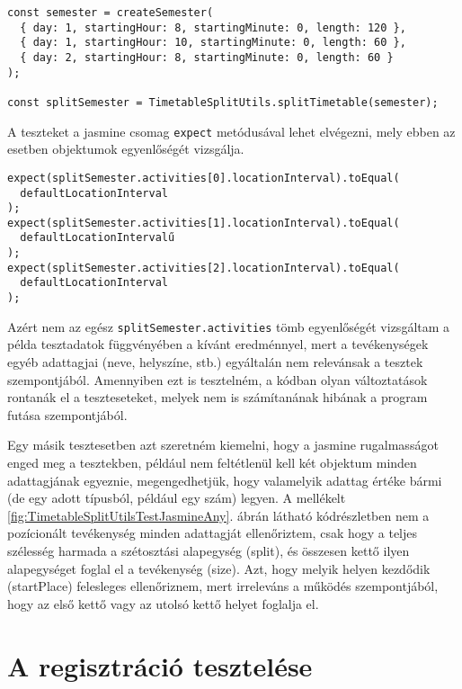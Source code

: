 \documentclass[a4paper,12pt]{report}
\begin{document}
\pagebreak
\begin{samepage}
    \begin{verbatim}
const semester = createSemester(
  { day: 1, startingHour: 8, startingMinute: 0, length: 120 },
  { day: 1, startingHour: 10, startingMinute: 0, length: 60 },
  { day: 2, startingHour: 8, startingMinute: 0, length: 60 }
);

const splitSemester = TimetableSplitUtils.splitTimetable(semester);
    \end{verbatim}
\end{samepage}

A teszteket a jasmine csomag \verb|expect| metódusával lehet elvégezni, mely ebben az esetben objektumok egyenlőségét vizsgálja.

\begin{samepage}
    \begin{verbatim}
expect(splitSemester.activities[0].locationInterval).toEqual(
  defaultLocationInterval
);
expect(splitSemester.activities[1].locationInterval).toEqual(
  defaultLocationIntervalű
);
expect(splitSemester.activities[2].locationInterval).toEqual(
  defaultLocationInterval
);
    \end{verbatim}
\end{samepage}

Azért nem az egész \verb|splitSemester.activities| tömb egyenlőségét vizsgáltam a példa tesztadatok függvényében a kívánt eredménnyel, mert a tevékenységek egyéb adattagjai (neve, helyszíne, stb.) egyáltalán nem relevánsak a tesztek szempontjából. Amennyiben ezt is tesztelném, a kódban olyan változtatások rontanák el a teszteseteket, melyek nem is számítanának hibának a program futása szempontjából.

Egy másik tesztesetben azt szeretném kiemelni, hogy a jasmine rugalmasságot enged meg a tesztekben, például nem feltétlenül kell két objektum minden adattagjának egyeznie, megengedhetjük, hogy valamelyik adattag értéke bármi (de egy adott típusból, például egy szám) legyen. A mellékelt \ref{fig:TimetableSplitUtilsTestJasmineAny}. ábrán látható kódrészletben nem a pozícionált tevékenység minden adattagját ellenőriztem, csak hogy a teljes szélesség harmada a szétosztási alapegység (split), és összesen kettő ilyen alapegységet foglal el a tevékenység (size). Azt, hogy melyik helyen kezdődik (startPlace) felesleges ellenőriznem, mert irreleváns a működés szempontjából, hogy az első kettő vagy az utolsó kettő helyet foglalja el.

\section{A regisztráció tesztelése}
\end{document}
